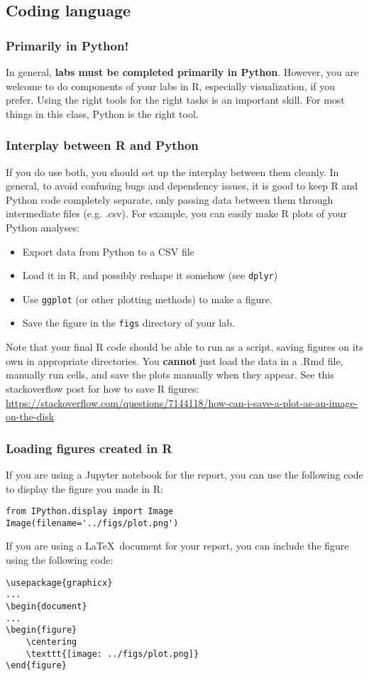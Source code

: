 \documentclass[letterpaper,12pt]{article}
\begin{document}
\subsection{Coding language}
\subsubsection{Primarily in Python!}
In general, \textbf{labs must be completed primarily in Python}. However, you are welcome to do components of your labs in R, especially visualization, if you prefer. Using the right tools for the right tasks is an important skill. For most things in this class, Python is the right tool.

\subsubsection{Interplay between R and Python}
If you do use both, you should set up the interplay between them cleanly. In general, to avoid confusing bugs and dependency issues, it is good to keep R and Python code completely separate, only passing data between them through intermediate files (e.g. .csv). For example, you can easily make R plots of your Python analyses:
\begin{itemize}
    \item Export data from Python to a CSV file
    \item Load it in R, and possibly reshape it somehow (see \texttt{dplyr})
    \item Use \texttt{ggplot} (or other plotting methods) to make a figure.
    \item Save the figure in the \texttt{figs} directory of your lab.
\end{itemize}
Note that your final R code should be able to run as a script, saving figures on its own in appropriate directories. You \textbf{cannot} just load the data in a .Rmd file, manually run cells, and save the plots manually when they appear. See this stackoverflow post for how to save R figures: \url{https://stackoverflow.com/questions/7144118/how-can-i-save-a-plot-as-an-image-on-the-disk}
\subsubsection{Loading figures created in R}
If you are using a Jupyter notebook for the report, you can use the following code to display the figure you made in R:
\begin{verbatim}
from IPython.display import Image
Image(filename='../figs/plot.png')
\end{verbatim}
If you are using a \LaTeX\ document for your report, you can include the figure using the following code:
\begin{verbatim}
\usepackage{graphicx}
...
\begin{document}
...
\begin{figure}
    \centering
    \texttt{[image: ../figs/plot.png]}
\end{figure}
\end{verbatim}
\end{document}
